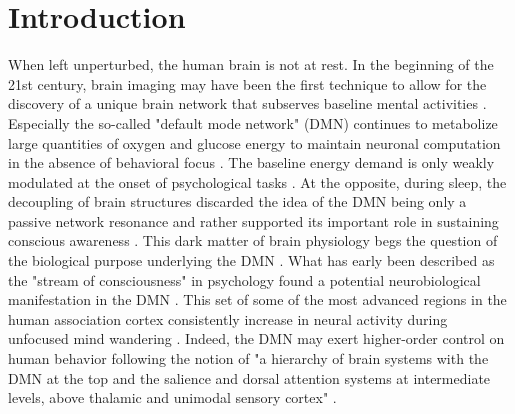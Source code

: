 \documentclass[10pt,letterpaper]{article}
\begin{document}

\section{Introduction}
%
When left unperturbed, the human brain is not at rest.
In the beginning of the 21st century,
brain imaging may have been the first technique
to allow for the discovery of a unique brain network that subserves
baseline mental activities
\citep{raichle2001pnas, bzdok2015resting}.
Especially the so-called "default mode network" (DMN) continues
to metabolize large quantities of
oxygen and glucose energy to maintain
neuronal computation
in the absence of behavioral focus
\citep{kenet2003spontaneously, fiser2004small}.
The baseline energy demand is only weakly modulated
at the onset of psychological tasks \citep{raichle2001pnas}.
At the opposite, during sleep, the
decoupling of brain structures discarded the idea of the DMN being
only a passive network resonance and rather supported its
important role in sustaining conscious awareness \citep{horovitz2009decoupling}.
This dark matter of brain physiology begs the question
of the biological purpose underlying the DMN
\citep{raichle2006brain}.
What has early been described as the "stream of consciousness"
in psychology \citep{james1890principles}
found a potential neurobiological manifestation
in the DMN
\citep{shul1997, raichle2001pnas}.
This set of some of the most advanced regions in
the human association cortex \citep{mesulam1998sensation, margulies2016situating}
consistently
increase in neural activity during
unfocused mind wandering \citep{raichle2001pnas}.
Indeed, the DMN may exert
higher-order control on human behavior
following the notion of "a hierarchy of brain systems with
the DMN at the top and the salience and dorsal attention systems
at intermediate levels, above thalamic and unimodal sensory
cortex" \citep{carhart2010default}.
\end{document}
